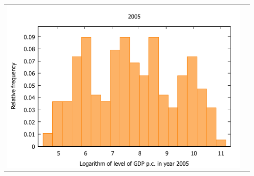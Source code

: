 \documentclass[a4paper]{article}
\begin{document}
\begin{center}
\begin{tabular}{cc}
  \includegraphics[scale=0.9]{1a_4}\end{tabular}
\end{center}

\end{document}
